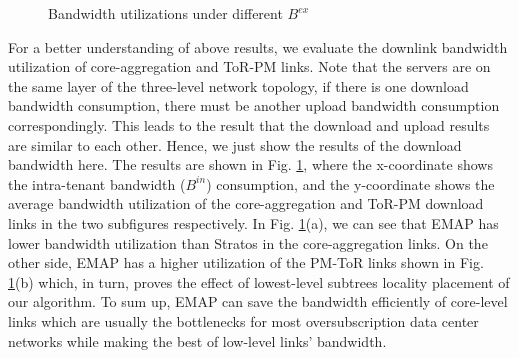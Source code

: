 \documentclass[review]{elsarticle}
\begin{document}
\begin{figure}[H]
	\centering
	\caption{Bandwidth utilizations under different $B^{ex}$}
	\label{fig:bw_util}
\end{figure}

For a better understanding of above results, we evaluate the downlink bandwidth utilization of core-aggregation and ToR-PM links. Note that the servers are on the same layer of the three-level network topology, if there is one download bandwidth consumption, there must be another upload bandwidth consumption correspondingly. This leads to the result that the download and upload results are similar to each other. Hence, we just show the results of the download bandwidth here. The results are shown in Fig. \ref{fig:bw_util}, where the x-coordinate shows the
 intra-tenant bandwidth ($B^{in}$) consumption, and the y-coordinate shows the average bandwidth utilization of the core-aggregation and ToR-PM download links in the two subfigures respectively. In Fig. \ref{fig:bw_util}(a), we can see that EMAP has lower bandwidth utilization than Stratos in the core-aggregation links. On the other side, EMAP has a higher utilization of the PM-ToR links shown in Fig. \ref{fig:bw_util}(b) which, in turn, proves the effect of lowest-level subtrees locality placement of our algorithm. To sum up, EMAP can save the bandwidth efficiently of core-level links which are usually the bottlenecks for most oversubscription data center networks while making the best of low-level links’ bandwidth. 
\end{document}
